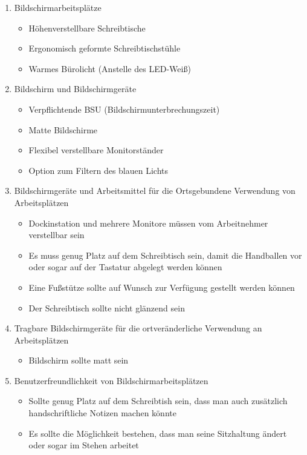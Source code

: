 \documentclass[a4paper, 12pt]{report}
\begin{document}
\begin{multicols}{2}
\begin{enumerate}
    \item Bildschirmarbeitsplätze
	\begin{itemize}
	    \item Höhenverstellbare Schreibtische
	    \item Ergonomisch geformte Schreibtischstühle
	    \item Warmes Bürolicht (Anstelle des LED-Weiß)
	\end{itemize}
    \item Bildschirm und Bildschirmgeräte
	\begin{itemize}
	    \item Verpflichtende BSU (Bildschirmunterbrechungszeit)
	    \item Matte Bildschirme
	    \item Flexibel verstellbare Monitorständer
	    \item Option zum Filtern des blauen Lichts
	\end{itemize}
    \item Bildschirmgeräte und Arbeitsmittel für die Ortsgebundene Verwendung
	von Arbeitsplätzen
	\begin{itemize}
	    \item Dockinstation und mehrere Monitore müssen vom Arbeitnehmer
		verstellbar sein
	    \item Es muss genug Platz auf dem Schreibtisch sein, damit die
		Handballen vor oder sogar auf der Tastatur abgelegt werden
		können
	    \item Eine Fußstütze sollte auf Wunsch zur Verfügung gestellt werden
		können
	    \item Der Schreibtisch sollte nicht glänzend sein
	\end{itemize}
    \item Tragbare Bildschirmgeräte für die ortveränderliche Verwendung an
	Arbeitsplätzen
	\begin{itemize}
	    \item Bildschirm sollte matt sein
	\end{itemize}
    \item Benutzerfreundlichkeit von Bildschirmarbeitsplätzen
	\begin{itemize}
	    \item Sollte genug Platz auf dem Schreibtish sein, dass man auch
		zusätzlich handschriftliche Notizen machen könnte
	    \item Es sollte die Möglichkeit bestehen, dass man seine Sitzhaltung
		ändert oder sogar im Stehen arbeitet
	\end{itemize}
\end{enumerate}


\end{multicols}
\end{document}
